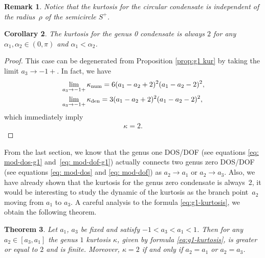 \documentclass[pdftex]{sigma}
\numberwithin{equation}{section}
\newtheorem{Theorem}{Theorem}[section]
\newtheorem{Corollary}[Theorem]{Corollary}
\newtheorem{Remark}[Theorem]{Remark}
\def\ra{\rightarrow}
\begin{document}
\begin{Remark}
Notice that the kurtosis for the circular condensate is independent of the radius~$\rho$ of the semicircle $S^+$.
\end{Remark}

\begin{Corollary}\label{thm: g0 kur}
The kurtosis for the genus 0 condensate is always $2$ for any $\alpha_1,\alpha_2\in (0,\pi)$ and $\alpha_1<\alpha_2$.
\end{Corollary}

\begin{proof}
This case can be degenerated from Proposition \ref{prop:g1 kur} by taking the limit $a_3\ra-1+$. In fact, we have
\begin{align*}
&\lim_{a_3\ra-1+}\kappa_{\rm num}=6 (a_{1}-a_{2}+2 )^{2} (a_{1}-a_{2}-2 )^{2},\\
&\lim_{a_3\ra-1+}\kappa_{\rm den}=3 (a_{1}-a_{2}+2 )^{2} (a_{1}-a_{2}-2 )^{2},
\end{align*}
which immediately imply
\begin{align*}
\kappa = 2.
\tag*{\qed}
\end{align*}
\renewcommand{\qed}{}
\end{proof}


From the last section, we know that the genus one DOS/DOF (see equations \eqref{eq: mod-dos-g1} and~\eqref{eq: mod-dof-g1}) actually connects two genus zero DOS/DOF (see equations \eqref{eq: mod-dos} and \eqref{eq: mod-dof}) as $a_2\ra a_1$ or $a_2\ra a_3$. Also, we have already shown that the kurtosis for the genus zero condensate is always~2, it would be interesting to study the dynamic of the kurtosis as the branch point~$a_2$ moving from $a_1$ to $a_3$. A careful analysis to the formula \eqref{eq:g1-kurtosis}, we obtain the following theorem.

\begin{Theorem}\label{Thm:g1 kappa ineq}
Let $a_1$, $a_3$ be fixed and satisfy $-1<a_3<a_1<1$. Then for any $a_2\in [a_3,a_1]$ the genus $1$ kurtosis $\kappa$, given by formula \eqref{eq:g1-kurtosis}, is greater or equal to $2$ and is finite. Moreover, $\kappa=2$ if and only if $a_2=a_1$ or $a_2=a_3$.






\end{Theorem}
\end{document}
